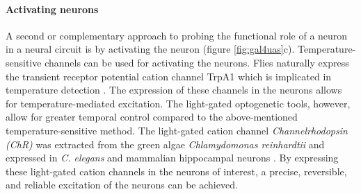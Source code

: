 \paragraph{Activating neurons}
A second or complementary approach to probing the functional role of a neuron in a neural circuit is by activating the neuron (figure \ref{fig:gal4uas}c). Temperature-sensitive channels can be used for activating the neurons. Flies naturally express the transient receptor potential cation channel TrpA1 which is implicated in temperature detection \parencite{Hamada2008, Pulver2009}. The expression of these channels in the neurons allows for temperature-mediated excitation. The light-gated optogenetic tools, however, allow for greater temporal control compared to the above-mentioned temperature-sensitive method. The light-gated cation channel \textit{Channelrhodopsin (ChR)} was extracted from the green algae \textit{Chlamydomonas reinhardtii} and expressed in \textit{C. elegans} and mammalian hippocampal neurons \parencite{Nagel2005, Boyden2005}. By expressing these light-gated cation channels in the neurons of interest, a precise, reversible, and reliable excitation of the neurons can be achieved.


